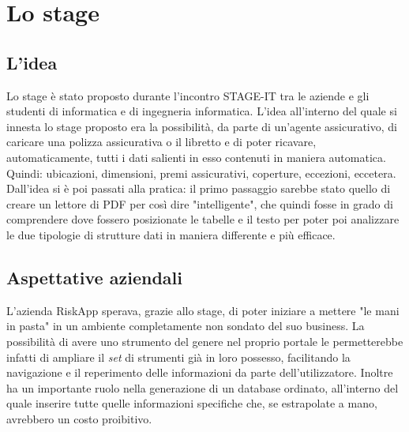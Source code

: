 
\chapter{Lo stage}
\label{cap:stage}


\section{L'idea}
Lo stage è stato proposto durante l'incontro STAGE-IT\cite{site:stageit} tra le aziende e gli studenti di informatica e di ingegneria informatica. L'idea all'interno del quale si innesta lo stage proposto era la possibilità, da parte di un'agente assicurativo, di caricare una polizza assicurativa o il libretto e di poter ricavare, automaticamente, tutti i dati salienti in esso contenuti in maniera automatica. Quindi: ubicazioni, dimensioni, premi assicurativi, coperture, eccezioni, eccetera. 
\medskip
\\Dall'idea si è poi passati alla pratica: il primo passaggio sarebbe stato quello di creare un lettore  di PDF per così dire "intelligente", che quindi fosse in grado di comprendere dove fossero posizionate le tabelle e il testo per poter poi analizzare le due tipologie di strutture dati in maniera differente e più efficace.

\section{Aspettative aziendali}
L'azienda RiskApp sperava, grazie allo stage, di poter iniziare a mettere "le mani in pasta" in un ambiente completamente non sondato del suo business. La possibilità di avere uno strumento del genere nel proprio portale le permetterebbe infatti di ampliare il \textit{set} di strumenti già in loro possesso, facilitando la navigazione e il reperimento delle informazioni da parte dell'utilizzatore. Inoltre ha un importante ruolo nella generazione di un database ordinato, all'interno del quale inserire tutte quelle informazioni specifiche che, se estrapolate a mano, avrebbero un costo proibitivo.


